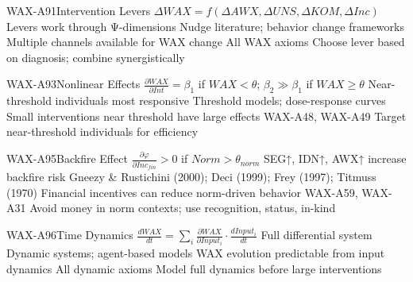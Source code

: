 \begin{axiomspec}{WAX-A91}{Intervention Levers}
 $\Delta WAX = f(\Delta AWX, \Delta UNS, \Delta KOM, \Delta Inc)$
 Levers work through Ψ-dimensions
 Nudge literature; behavior change frameworks
 Multiple channels available for WAX change
 All WAX axioms
 Choose lever based on diagnosis; combine synergistically
\end{axiomspec}

\begin{axiomspec}{WAX-A93}{Nonlinear Effects}
 $\frac{\partial WAX}{\partial Int} = \beta_1$ if $WAX < \theta$; $\beta_2 \gg \beta_1$ if $WAX \geq \theta$
 Near-threshold individuals most responsive
 Threshold models; dose-response curves
 Small interventions near threshold have large effects
 WAX-A48, WAX-A49
 Target near-threshold individuals for efficiency
\end{axiomspec}

\begin{axiomspec}{WAX-A95}{Backfire Effect}
 $\frac{\partial \varphi}{\partial Inc_{fin}} > 0$ if $Norm > \theta_{norm}$
 SEG↑, IDN↑, AWX↑ increase backfire risk
 Gneezy \& Rustichini (2000); Deci (1999); Frey (1997); Titmuss (1970)
 Financial incentives can reduce norm-driven behavior
 WAX-A59, WAX-A31
 Avoid money in norm contexts; use recognition, status, in-kind
\end{axiomspec}


\begin{axiomspec}{WAX-A96}{Time Dynamics}
 $\frac{dWAX}{dt} = \sum_i \frac{\partial WAX}{\partial Input_i} \cdot \frac{dInput_i}{dt}$
 Full differential system
 Dynamic systems; agent-based models
 WAX evolution predictable from input dynamics
 All dynamic axioms
 Model full dynamics before large interventions
\end{axiomspec}

